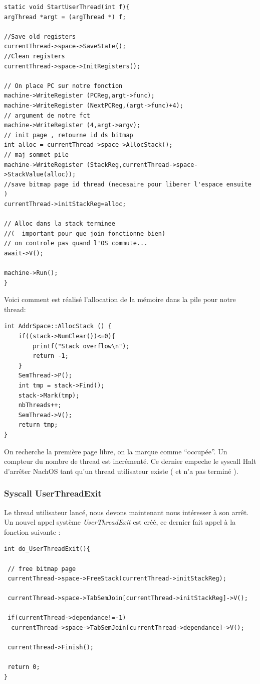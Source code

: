 \documentclass[a4paper,10pt]{article}
\begin{document}
\begin{lstlisting}[frame=single]
 static void StartUserThread(int f){
argThread *argt = (argThread *) f;

//Save old registers
currentThread->space->SaveState();
//Clean registers
currentThread->space->InitRegisters();

// On place PC sur notre fonction
machine->WriteRegister (PCReg,argt->func);
machine->WriteRegister (NextPCReg,(argt->func)+4);
// argument de notre fct
machine->WriteRegister (4,argt->argv);
// init page , retourne id ds bitmap
int alloc = currentThread->space->AllocStack();
// maj sommet pile
machine->WriteRegister (StackReg,currentThread->space->StackValue(alloc));
//save bitmap page id thread (necesaire pour liberer l'espace ensuite )
currentThread->initStackReg=alloc;

// Alloc dans la stack terminee
//(  important pour que join fonctionne bien)
// on controle pas quand l'OS commute...
await->V();

machine->Run();
}
\end{lstlisting}

Voici comment est réalisé l'allocation de la mémoire dans la pile pour notre thread:
\begin{lstlisting}[frame=single]
 int AddrSpace::AllocStack () {
	if((stack->NumClear())<=0){
		printf("Stack overflow\n");
		return -1;
	}
	SemThread->P();	
	int tmp = stack->Find();
	stack->Mark(tmp);
	nbThreads++;
	SemThread->V();
	return tmp;
}
\end{lstlisting}

On recherche la première page libre, on la marque comme ``occupée''. Un compteur du nombre de thread est incrémenté.
Ce dernier empeche le syscall Halt d'arrêter NachOS tant qu'un thread utilisateur existe ( et n'a pas terminé ).
\newpage
\subsubsection{Syscall UserThreadExit}
Le thread utilisateur lancé, nous devons maintenant nous intéresser à son arrêt.
Un nouvel appel système \textit{UserThreadExit} est créé, ce dernier fait appel à la fonction suivante :

\begin{lstlisting}[frame=single]
 int do_UserThreadExit(){

 // free bitmap page
 currentThread->space->FreeStack(currentThread->initStackReg);
 
 currentThread->space->TabSemJoin[currentThread->initStackReg]->V();
 
 if(currentThread->dependance!=-1)
  currentThread->space->TabSemJoin[currentThread->dependance]->V();
 
 currentThread->Finish();
 
 return 0;
}
\end{lstlisting}
\newpage
\end{document}
